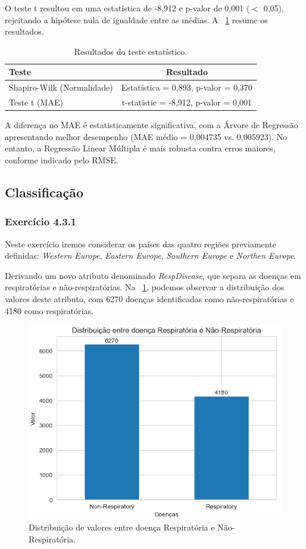 \documentclass[conference]{IEEEtran}
\begin{document}
O teste t resultou em uma estatística de -8,912 e p-valor de 0,001 ($<$ 0,05), rejeitando a hipótese nula de igualdade entre as médias. A \tablename~\ref{tab:stat_test} resume os resultados.

\begin{table}[h]
	\centering
	\caption{Resultados do teste estatístico.}
	\label{tab:stat_test}
	\begin{tabular}{lc}
		\toprule
		\textbf{Teste} & \textbf{Resultado} \\
		\midrule
		Shapiro-Wilk (Normalidade) & Estatística = 0,893, p-valor = 0,370 \\
		Teste t (MAE) & t-statistic = -8,912, p-valor = 0,001 \\
		\bottomrule
	\end{tabular}
\end{table}

A diferença no MAE é estatisticamente significativa, com a Árvore de Regressão apresentando melhor desempenho (MAE médio = 0,004735 vs. 0,005923). No entanto, a Regressão Linear Múltipla é mais robusta contra erros maiores, conforme indicado pelo RMSE.


\subsection{Classificação}\label{AA}

\subsubsection{\textbf{Exercício 4.3.1}}

Neste exercício iremos considerar os países das quatro regiões previamente definidas: \textit{Western Europe}, \textit{Eastern Europe}, \textit{Southern Europe} e \textit{Northen Europe}.

Derivando um novo atributo denominado \textit{RespDisease}, que separa as doenças em respiratórias e não-respiratórias. Na \figurename~\ref{fig:grafico_doenca_respir}, podemos observar a distribuição dos valores deste atributo, com 6270 doenças identificadas como não-respiratórias e 4180 como respiratórias.


\begin{figure}[h]
	\centering
	\includegraphics[width=0.6\linewidth]{grafico_doenca_respir}
	\caption{Distribuição de valores entre doença Respiratória e Não-Respiratória.}
	\label{fig:grafico_doenca_respir}
\end{figure}
\end{document}
